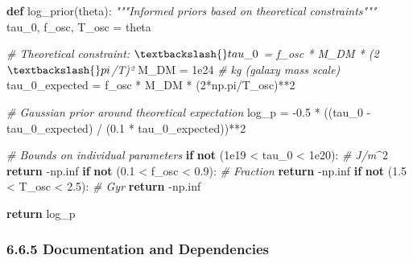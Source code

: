 \documentclass[
  11pt,
]{report}
\newenvironment{Shaded}{}{}
\newcommand{\CommentTok}[1]{\textcolor[rgb]{0.38,0.63,0.69}{\textit{#1}}}
\newcommand{\ControlFlowTok}[1]{\textcolor[rgb]{0.00,0.44,0.13}{\textbf{#1}}}
\newcommand{\DecValTok}[1]{\textcolor[rgb]{0.25,0.63,0.44}{#1}}
\newcommand{\FloatTok}[1]{\textcolor[rgb]{0.25,0.63,0.44}{#1}}
\newcommand{\KeywordTok}[1]{\textcolor[rgb]{0.00,0.44,0.13}{\textbf{#1}}}
\newcommand{\NormalTok}[1]{#1}
\newcommand{\OperatorTok}[1]{\textcolor[rgb]{0.40,0.40,0.40}{#1}}
\begin{document}
\begin{Shaded}
\begin{Highlighting}[]
\KeywordTok{def}\NormalTok{ log\_prior(theta):}
    \CommentTok{"""Informed priors based on theoretical constraints"""}
\NormalTok{    tau\_0, f\_osc, T\_osc }\OperatorTok{=}\NormalTok{ theta}
    
    \CommentTok{\# Theoretical constraint: $\textbackslash{}tau\_0$ = f\_osc * M\_DM * (2$\textbackslash{}pi$/T)²}
\NormalTok{    M\_DM }\OperatorTok{=} \FloatTok{1e24}  \CommentTok{\# kg (galaxy mass scale)}
\NormalTok{    tau\_0\_expected }\OperatorTok{=}\NormalTok{ f\_osc }\OperatorTok{*}\NormalTok{ M\_DM }\OperatorTok{*}\NormalTok{ (}\DecValTok{2}\OperatorTok{*}\NormalTok{np.pi}\OperatorTok{/}\NormalTok{T\_osc)}\OperatorTok{**}\DecValTok{2}
    
    \CommentTok{\# Gaussian prior around theoretical expectation}
\NormalTok{    log\_p }\OperatorTok{=} \OperatorTok{{-}}\FloatTok{0.5} \OperatorTok{*}\NormalTok{ ((tau\_0 }\OperatorTok{{-}}\NormalTok{ tau\_0\_expected) }\OperatorTok{/}\NormalTok{ (}\FloatTok{0.1} \OperatorTok{*}\NormalTok{ tau\_0\_expected))}\OperatorTok{**}\DecValTok{2}
    
    \CommentTok{\# Bounds on individual parameters}
    \ControlFlowTok{if} \KeywordTok{not}\NormalTok{ (}\FloatTok{1e19} \OperatorTok{\textless{}}\NormalTok{ tau\_0 }\OperatorTok{\textless{}} \FloatTok{1e20}\NormalTok{):  }\CommentTok{\# J/m$\^{}2$}
        \ControlFlowTok{return} \OperatorTok{{-}}\NormalTok{np.inf}
    \ControlFlowTok{if} \KeywordTok{not}\NormalTok{ (}\FloatTok{0.1} \OperatorTok{\textless{}}\NormalTok{ f\_osc }\OperatorTok{\textless{}} \FloatTok{0.9}\NormalTok{):     }\CommentTok{\# Fraction}
        \ControlFlowTok{return} \OperatorTok{{-}}\NormalTok{np.inf}
    \ControlFlowTok{if} \KeywordTok{not}\NormalTok{ (}\FloatTok{1.5} \OperatorTok{\textless{}}\NormalTok{ T\_osc }\OperatorTok{\textless{}} \FloatTok{2.5}\NormalTok{):     }\CommentTok{\# Gyr}
        \ControlFlowTok{return} \OperatorTok{{-}}\NormalTok{np.inf}
    
    \ControlFlowTok{return}\NormalTok{ log\_p}
\end{Highlighting}
\end{Shaded}

\subsubsection{6.6.5 Documentation and
Dependencies}\label{documentation-and-dependencies}
\end{document}
